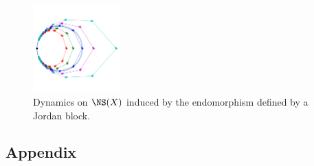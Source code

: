     \begin{figure}[!ht]
        \centering
        \includegraphics[width=0.3\textwidth]{jordan_block_action_plot_product_of_elliptic_curve.png}
        \caption{Dynamics on \(\NS(X)\) induced by the endomorphism defined by a Jordan block.}
        \label{fig:dynamics_on_NS_of_product_of_elliptic_curves_Jordan_block}
    \end{figure}




    \subsection{Appendix}
        
        

